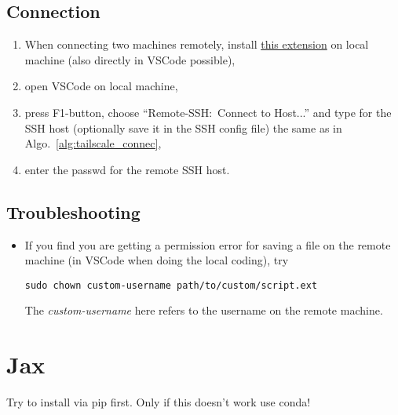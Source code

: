 \documentclass[12pt, a4paper]{article}
\numberwithin{equation}{section}
\theoremstyle{definition}
\theoremstyle{definition}
\begin{document}
	\subsection{Connection}
	
		\begin{enumerate}
			\item When connecting two machines remotely, install \href{https://marketplace.visualstudio.com/items?itemName=ms-vscode-remote.vscode-remote-extensionpack}{this extension} on local machine (also directly in VSCode possible), 
			\item open VSCode on local machine, 
			\item press F1-button, choose \enquote{Remote-SSH:~Connect to Host...} and type for the SSH host (optionally save it in the SSH config file) the same as in Algo.~\eqref{alg:tailscale_connec}, 
			\item enter the passwd for the remote SSH host. 
		\end{enumerate}	

	\subsection{Troubleshooting}
	
		\begin{itemize}
			\item If you find you are getting a permission error for saving a file on the remote machine (in VSCode when doing the local coding), try
			
			\begin{lstlisting}[style=mystylebash, label=alg:remote_troubleshooting, xleftmargin=\parindent]
				sudo chown custom-username path/to/custom/script.ext
			\end{lstlisting}
			
			The \textit{custom-username} here refers to the username on the remote machine.
			
		\end{itemize}
	
	\newpage	
	
	\section{Jax}
	
	Try to install via pip first. Only if this doesn't work use conda!
	
\end{document}
